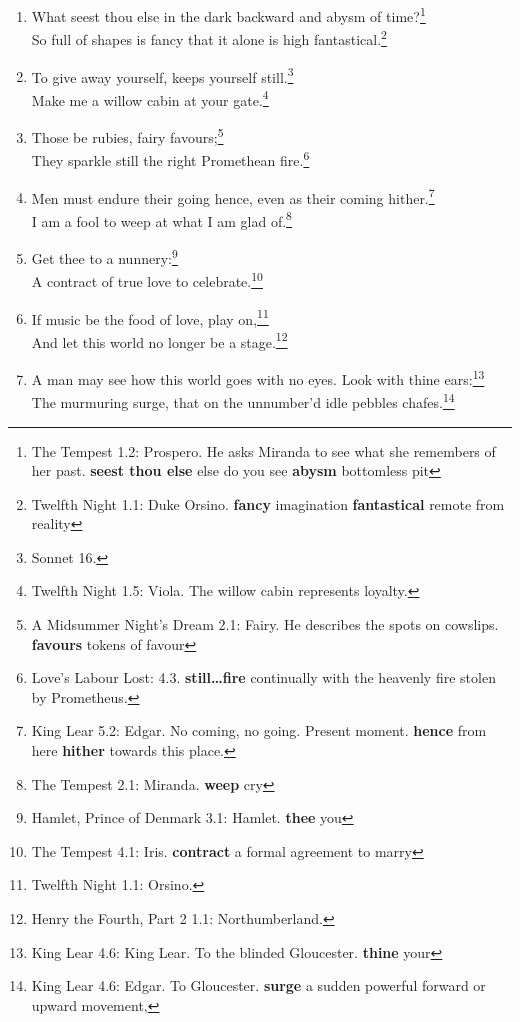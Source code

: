 \documentclass[17pt,twoside]{extarticle}
\begin{document}
\begin{enumerate}
{    you own, that is yours}
\item
  What seest thou else in the dark backward and abysm of time?\footnote{The
    Tempest 1.2: Prospero. He asks Miranda to see what she remembers of
    her past. \textbf{seest thou else} else do you see \textbf{abysm}
    bottomless pit}\\So full of shapes is fancy that it alone is high
  fantastical.\footnote{Twelfth Night 1.1: Duke Orsino. \textbf{fancy}
    imagination \textbf{fantastical} remote from reality}
\item
  To give away yourself, keeps yourself still.\footnote{Sonnet 16.}\\Make
  me a willow cabin at your gate.\footnote{Twelfth Night 1.5: Viola. The
    willow cabin represents loyalty.}
\item
  Those be rubies, fairy favours;\footnote{A Midsummer Night's Dream
    2.1: Fairy. He describes the spots on cowslips. \textbf{favours}
    tokens of favour}\\They sparkle still the right Promethean
  fire.\footnote{Love's Labour Lost: 4.3. \textbf{still\ldots{}fire}
    continually with the heavenly fire stolen by Prometheus.}
\item
  Men must endure their going hence, even as their coming
  hither.\footnote{King Lear 5.2: Edgar. No coming, no going. Present
    moment. \textbf{hence} from here \textbf{hither} towards this place.}\\I
  am a fool to weep at what I am glad of.\footnote{The Tempest 2.1:
    Miranda. \textbf{weep} cry}
\item
  Get thee to a nunnery:\footnote{Hamlet, Prince of Denmark 3.1: Hamlet.
    \textbf{thee} you}\\A contract of true love to celebrate.\footnote{The
    Tempest 4.1: Iris. \textbf{contract} a formal agreement to marry}
\item
  If music be the food of love, play on,\footnote{Twelfth Night 1.1:
    Orsino.}\\And let this world no longer be a stage.\footnote{Henry
    the Fourth, Part 2 1.1: Northumberland.}
\item
  A man may see how this world goes with no eyes. Look with thine
  ears:\footnote{King Lear 4.6: King Lear. To the blinded Gloucester.
    \textbf{thine} your}\\The murmuring surge, that on the unnumber'd
  idle pebbles chafes.\footnote{King Lear 4.6: Edgar. To Gloucester.
    \textbf{surge} a sudden powerful forward or upward movement,
}
\end{enumerate}
\end{document}
